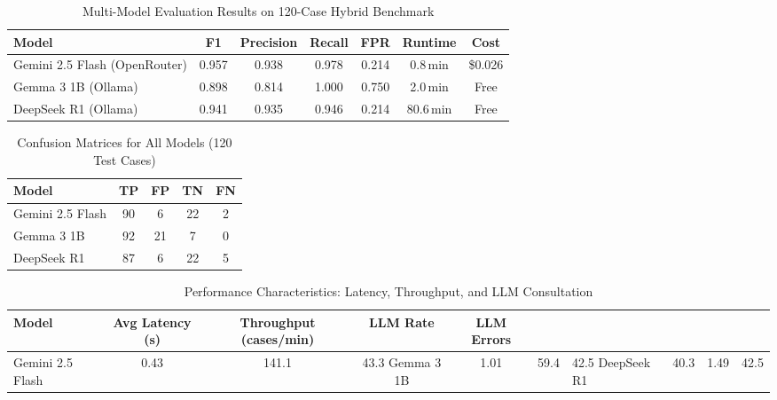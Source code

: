 \documentclass{article}
\begin{document}
\begin{table}[htbp]
\centering
\caption{Multi-Model Evaluation Results on 120-Case Hybrid Benchmark}
\label{tab:results}
\begin{tabular}{lcccccc}
\toprule
\textbf{Model} & \textbf{F1} & \textbf{Precision} & \textbf{Recall} & \textbf{FPR} & \textbf{Runtime} & \textbf{Cost} \\
\midrule
Gemini 2.5 Flash (OpenRouter) & 0.957 & 0.938 & 0.978 & 0.214 & 0.8\,min & \$0.026 \\
Gemma 3 1B (Ollama)           & 0.898 & 0.814 & 1.000 & 0.750 & 2.0\,min & Free \\
DeepSeek R1 (Ollama)          & 0.941 & 0.935 & 0.946 & 0.214 & 80.6\,min & Free \\
\bottomrule
\end{tabular}
\end{table}

\begin{table}[htbp]
\centering
\caption{Confusion Matrices for All Models (120 Test Cases)}
\label{tab:confusion}
\begin{tabular}{lcccc}
\toprule
\textbf{Model} & \textbf{TP} & \textbf{FP} & \textbf{TN} & \textbf{FN} \\
\midrule
Gemini 2.5 Flash & 90 & 6 & 22 & 2 \\
Gemma 3 1B       & 92 & 21 & 7 & 0 \\
DeepSeek R1      & 87 & 6 & 22 & 5 \\
\bottomrule
\end{tabular}
\end{table}

\begin{table}[htbp]
\centering
\caption{Performance Characteristics: Latency, Throughput, and LLM Consultation}
\label{tab:perf}
\begin{tabular}{lcccc}
\toprule
\textbf{Model} & \textbf{Avg Latency (s)} & \textbf{Throughput (cases/min)} & \textbf{LLM Rate} & \textbf{LLM Errors} \\
\midrule
Gemini 2.5 Flash & 0.43 & 141.1 & 43.3%
Gemma 3 1B       & 1.01 & 59.4 & 42.5%
DeepSeek R1      & 40.3  & 1.49 & 42.5%
\bottomrule
\end{tabular}
\end{table}
\end{document}
